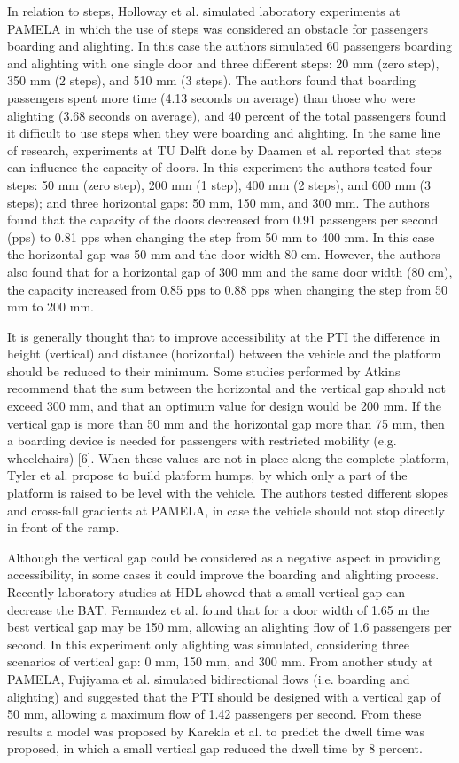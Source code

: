 In relation to steps, Holloway et al. \cite{Ref30} simulated laboratory experiments at PAMELA in which the use of steps was considered an obstacle for passengers boarding and alighting. In this case the authors simulated 60 passengers boarding and alighting with one single door and three different steps: 20 mm (zero step), 350 mm (2 steps), and 510 mm (3 steps). The authors found that boarding passengers spent more time (4.13 seconds on average) than those who were alighting (3.68 seconds on average), and 40 percent of the total passengers found it difficult to use steps when they were boarding and alighting. In the same line of research, experiments at TU Delft done by Daamen et al. \cite{Ref31} reported that steps can influence the capacity of doors. In this experiment the authors tested four steps: 50 mm (zero step), 200 mm (1 step), 400 mm (2 steps), and 600 mm (3 steps); and three horizontal gaps: 50 mm, 150 mm, and 300 mm. The authors found that the capacity of the doors decreased from 0.91 passengers per second (pps) to 0.81 pps when changing the step from 50 mm to 400 mm. In this case the horizontal gap was 50 mm and the door width 80 cm. However, the authors also found that for a horizontal gap of 300 mm and the same door width (80 cm), the capacity increased from 0.85 pps to 0.88 pps when changing the step from 50 mm to 200 mm.

It is generally thought that to improve accessibility at the PTI the difference in height (vertical) and distance (horizontal) between the vehicle and the platform should be reduced to their minimum. Some studies performed by Atkins \cite{Ref32} recommend that the sum between the horizontal and the vertical gap should not exceed 300 mm, and that an optimum value for design would be 200 mm. If the vertical gap is more than 50 mm and the horizontal gap more than 75 mm, then a boarding device is needed for passengers with restricted mobility (e.g. wheelchairs) [6]. When these values are not in place along the complete platform, Tyler et al. \cite{Ref33} propose to build platform humps, by which only a part of the platform is raised to be level with the vehicle. The authors tested different slopes and cross-fall gradients at PAMELA, in case the vehicle should not stop directly in front of the ramp.

Although the vertical gap could be considered as a negative aspect in providing accessibility, in some cases it could improve the boarding and alighting process. Recently laboratory studies at HDL showed that a small vertical gap can decrease the BAT. Fernandez et al. \cite{Ref34} found that for a door width of 1.65 m the best vertical gap may be 150 mm, allowing an alighting flow of 1.6 passengers per second. In this experiment only alighting was simulated, considering three scenarios of vertical gap: 0 mm, 150 mm, and 300 mm. From another study at PAMELA, Fujiyama et al. \cite{Ref35} simulated bidirectional flows (i.e. boarding and alighting) and suggested that the PTI should be designed with a vertical gap of 50 mm, allowing a maximum flow of 1.42 passengers per second. From these results a model was proposed by Karekla et al. \cite{Ref36} to predict the dwell time was proposed, in which a small vertical gap reduced the dwell time by 8 percent. 

